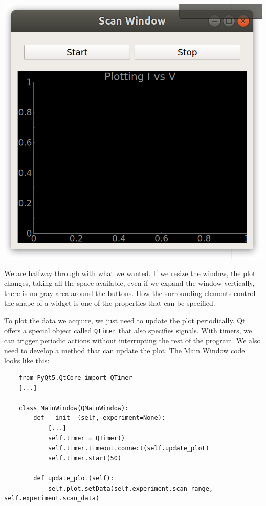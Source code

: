 \begin{center}
    \includegraphics[width=.4\textwidth]{images/Chapter_08/07_window_empty_plot.png}
\end{center}

We are halfway through with what we wanted. If we resize the window, the plot changes, taking all the space available, even if we expand the window vertically, there is no gray area around the buttons. How the surrounding elements control the shape of a widget is one of the properties that can be specified.


To plot the data we acquire, we just need to update the plot periodically. Qt offers a special object called \texttt{QTimer} that also specifies signals. With timers, we can trigger periodic actions without interrupting the rest of the program. We also need to develop a method that can update the plot. The Main Window code looks like this:

\begin{verbatim}
    from PyQt5.QtCore import QTimer
    [...]

    class MainWindow(QMainWindow):
        def __init__(self, experiment=None):
            [...]
            self.timer = QTimer()
            self.timer.timeout.connect(self.update_plot)
            self.timer.start(50)

        def update_plot(self):
            self.plot.setData(self.experiment.scan_range, self.experiment.scan_data)
\end{verbatim}

